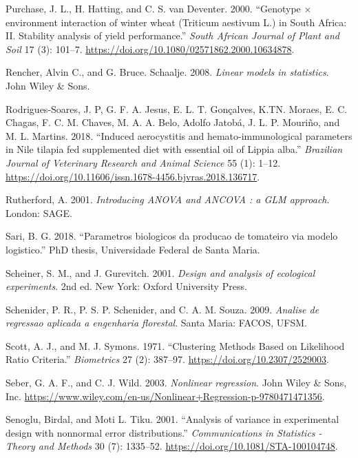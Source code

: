 \documentclass[
]{book}
\numberwithin{equation}{section}
\newlength{\cslhangindent}
\newenvironment{cslreferences}%
  {\setlength{\parindent}{0pt}%
  \everypar{\setlength{\hangindent}{\cslhangindent}}\ignorespaces}%
  {\par}
\begin{document}
\begin{cslreferences}
\leavevmode\hypertarget{ref-Purchase2000}{}%
Purchase, J. L., H. Hatting, and C. S. van Deventer. 2000. ``Genotype × environment interaction of winter wheat (Triticum aestivum L.) in South Africa: II. Stability analysis of yield performance.'' \emph{South African Journal of Plant and Soil} 17 (3): 101--7. \url{https://doi.org/10.1080/02571862.2000.10634878}.

\leavevmode\hypertarget{ref-Rencher2008}{}%
Rencher, Alvin C., and G. Bruce. Schaalje. 2008. \emph{Linear models in statistics}. John Wiley \& Sons.

\leavevmode\hypertarget{ref-Rodrigues-Soares2018}{}%
Rodrigues-Soares, J. P, G. F. A. Jesus, E. L. T. Gonçalves, K.TN. Moraes, E. C. Chagas, F. C. M. Chaves, M. A. A. Belo, Adolfo Jatobá, J. L. P. Mouriño, and M. L. Martins. 2018. ``Induced aerocystitis and hemato-immunological parameters in Nile tilapia fed supplemented diet with essential oil of Lippia alba.'' \emph{Brazilian Journal of Veterinary Research and Animal Science} 55 (1): 1--12. \url{https://doi.org/10.11606/issn.1678-4456.bjvras.2018.136717}.

\leavevmode\hypertarget{ref-Rutherford2001}{}%
Rutherford, A. 2001. \emph{Introducing ANOVA and ANCOVA : a GLM approach}. London: SAGE.

\leavevmode\hypertarget{ref-Sari2018}{}%
Sari, B. G. 2018. ``Parametros biologicos da producao de tomateiro via modelo logistico.'' PhD thesis, Universidade Federal de Santa Maria.

\leavevmode\hypertarget{ref-Scheiner2001}{}%
Scheiner, S. M., and J. Gurevitch. 2001. \emph{Design and analysis of ecological experiments}. 2nd ed. New York: Oxford University Press.

\leavevmode\hypertarget{ref-Schneider2009}{}%
Schenider, P. R., P. S. P. Schenider, and C. A. M. Souza. 2009. \emph{Analise de regressao aplicada a engenharia florestal}. Santa Maria: FACOS, UFSM.

\leavevmode\hypertarget{ref-Scott1971}{}%
Scott, A. J., and M. J. Symons. 1971. ``Clustering Methods Based on Likelihood Ratio Criteria.'' \emph{Biometrics} 27 (2): 387--97. \url{https://doi.org/10.2307/2529003}.

\leavevmode\hypertarget{ref-Seber2003}{}%
Seber, G. A. F., and C. J. Wild. 2003. \emph{Nonlinear regression}. John Wiley \& Sons, Inc. \url{https://www.wiley.com/en-us/Nonlinear+Regression-p-9780471471356}.

\leavevmode\hypertarget{ref-Senoglu2001}{}%
Senoglu, Birdal, and Moti L. Tiku. 2001. ``Analysis of variance in experimental design with nonnormal error distributions.'' \emph{Communications in Statistics - Theory and Methods} 30 (7): 1335--52. \url{https://doi.org/10.1081/STA-100104748}.


\end{cslreferences}
\end{document}
